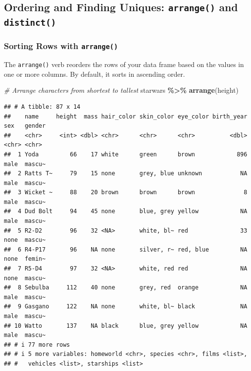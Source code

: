 \documentclass[
  11pt,
]{article}
\newenvironment{Shaded}{\begin{snugshade}}{\end{snugshade}}
\newcommand{\CommentTok}[1]{\textcolor[rgb]{0.56,0.35,0.01}{\textit{#1}}}
\newcommand{\FunctionTok}[1]{\textcolor[rgb]{0.13,0.29,0.53}{\textbf{#1}}}
\newcommand{\NormalTok}[1]{#1}
\newcommand{\SpecialCharTok}[1]{\textcolor[rgb]{0.81,0.36,0.00}{\textbf{#1}}}
\begin{document}
\subsection{\texorpdfstring{Ordering and Finding Uniques:
\texttt{arrange()} and
\texttt{distinct()}}{Ordering and Finding Uniques: arrange() and distinct()}}\label{ordering-and-finding-uniques-arrange-and-distinct}

\subsubsection{\texorpdfstring{Sorting Rows with
\texttt{arrange()}}{Sorting Rows with arrange()}}\label{sorting-rows-with-arrange}

The \texttt{arrange()} verb reorders the rows of your data frame based
on the values in one or more columns. By default, it sorts in ascending
order.

\begin{Shaded}
\begin{Highlighting}[]
\CommentTok{\# Arrange characters from shortest to tallest}
\NormalTok{starwars }\SpecialCharTok{\%\textgreater{}\%} 
  \FunctionTok{arrange}\NormalTok{(height)}
\end{Highlighting}
\end{Shaded}

\begin{verbatim}
## # A tibble: 87 x 14
##    name     height  mass hair_color skin_color eye_color birth_year sex   gender
##    <chr>     <int> <dbl> <chr>      <chr>      <chr>          <dbl> <chr> <chr> 
##  1 Yoda         66    17 white      green      brown            896 male  mascu~
##  2 Ratts T~     79    15 none       grey, blue unknown           NA male  mascu~
##  3 Wicket ~     88    20 brown      brown      brown              8 male  mascu~
##  4 Dud Bolt     94    45 none       blue, grey yellow            NA male  mascu~
##  5 R2-D2        96    32 <NA>       white, bl~ red               33 none  mascu~
##  6 R4-P17       96    NA none       silver, r~ red, blue         NA none  femin~
##  7 R5-D4        97    32 <NA>       white, red red               NA none  mascu~
##  8 Sebulba     112    40 none       grey, red  orange            NA male  mascu~
##  9 Gasgano     122    NA none       white, bl~ black             NA male  mascu~
## 10 Watto       137    NA black      blue, grey yellow            NA male  mascu~
## # i 77 more rows
## # i 5 more variables: homeworld <chr>, species <chr>, films <list>,
## #   vehicles <list>, starships <list>
\end{verbatim}
\end{document}
